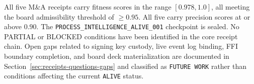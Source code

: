 All five M\&A receipts carry fitness scores in the range $[0.978, 1.0]$, all meeting
the board admissibility threshold of $\geq 0.95$. All five carry precision scores at
or above $0.90$. The \texttt{PROCESS\_INTELLIGENCE\_ALIVE\_001} checkpoint is sealed.
No PARTIAL or BLOCKED conditions have been identified in the core receipt chain.
Open gaps related to signing key custody, live event log binding, FFI boundary
completion, and board deck materialization are documented in
Section~\ref{sec:receipts-questions-gaps} and classified as \texttt{FUTURE WORK}
rather than conditions affecting the current \texttt{ALIVE} status.
